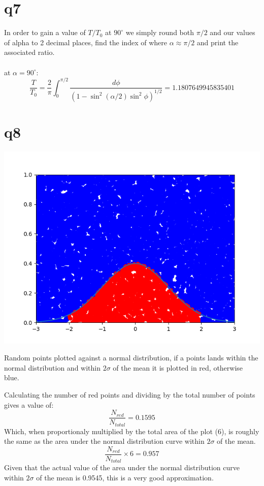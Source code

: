 \documentclass[a4paper,english]{article}
\begin{document}
    \section{q7}
    
        In order to gain a value of $T/T_0$ at $90^\circ$ we simply round both $\pi/2$ and 
        our values of alpha to 2 decimal places, find the index of where $\alpha \approx \pi/2$
        and print the associated ratio.
        \\
        \\
        at $\alpha = 90^\circ$:
    \begin{equation}
        \frac{T}{T_0} = \frac{2}{\pi}\int_0^{\pi/2}\frac{d\phi}{(1-\sin^2(\alpha/2)\sin^2\phi)^{1/2}} 
        = 1.1807649945835401
    \end{equation}
    \section{q8}
    
    \begin{center}
        \includegraphics[scale=0.8]{./3_8.png}
        \caption{Random points plotted against a normal distribution, if a points lands within the normal distribution and within $2\sigma$ of the mean it is plotted in red, otherwise blue.}
    \end{center}
    Calculating the number of red points and dividing by the total number of points gives a value of:
    \begin{equation}
        \frac{N_{red}}{N_{total}} = 0.1595
    \end{equation}
    Which, when proportionaly multiplied by the total area of the plot (6), is roughly the same as the area under the normal distribution curve within $2\sigma$ of the mean.
    \begin{equation}
        \frac{N_{red}}{N_{total}} \times 6 = 0.957
    \end{equation}
    Given that the actual value of the area under the normal distribution curve within $2\sigma$ of the mean is 0.9545, this is a very good approximation.
    
\end{document}
